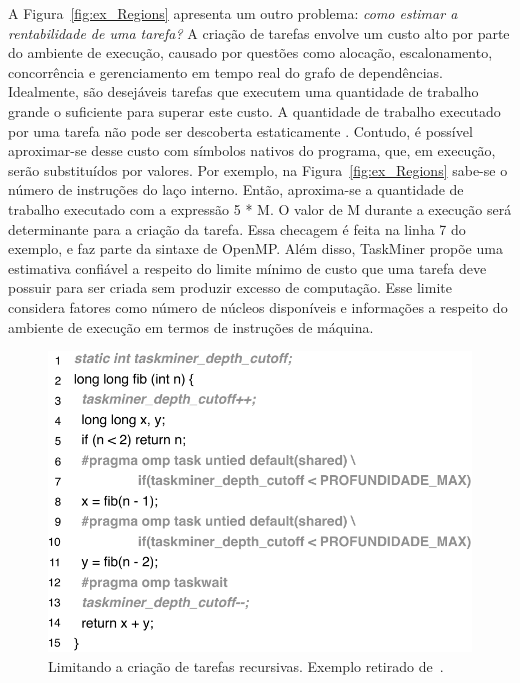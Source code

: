 \documentclass[sigconf]{acmart}
\newcommand\Taskminer{\mbox{\textsf{TaskMiner}}}
\begin{document}
A Figura~\ref{fig:ex_Regions} apresenta um outro problema: {\em como estimar a rentabilidade de uma tarefa?}
A criação de tarefas envolve um custo alto por parte do ambiente de execução, causado por questões como
alocação, escalonamento, concorrência e gerenciamento em tempo real do grafo de dependências.
Idealmente, são desejáveis tarefas que executem uma quantidade de trabalho
grande o suficiente para superar este custo. A quantidade de trabalho executado
por uma tarefa não pode ser descoberta estaticamente \cite{Rice53}. Contudo,
é possível aproximar-se desse custo com
símbolos nativos do programa, que, em execução, serão substituídos por valores. 
Por exemplo, na Figura~\ref{fig:ex_Regions}
sabe-se o número de instruções do laço interno. Então, aproxima-se a quantidade de trabalho executado
com a expressão \textsf{5 * M}. O valor de \textsf{M} durante a execução será determinante para
a criação da tarefa. Essa checagem é feita na linha 7 do exemplo, 
e faz parte da sintaxe de OpenMP. Além disso, {\Taskminer} propõe
uma estimativa confiável a respeito do limite mínimo de custo 
que uma tarefa deve possuir para ser criada sem produzir
excesso de computação. Esse limite considera fatores como número de 
núcleos disponíveis e informações a respeito do ambiente
de execução em termos de instruções de máquina.
	
\begin{figure}[h!]
\begin{center}
\includegraphics[width=1\columnwidth]{images/ex_cutoff}
\caption{Limitando a criação de tarefas recursivas.
Exemplo retirado de~\cite[Fig.1]{Iwasaki16}.}
\label{fig:ex_cutoff}
\end{center}
\end{figure}
	
\end{document}
